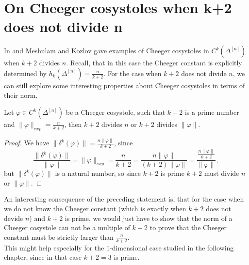%
%
%
%

\section{On Cheeger cosystoles when k+2 does not divide n}\label{section26}

In \cite{4} and \cite{6} Meshulam and Kozlov gave examples of Cheeger cosystoles in \(C^k(\Delta^{[n]})\) when \(k+2\) divides \(n\). Recall, that in this case the Cheeger constant is explicitly determined by \(h_k(\Delta^{[n]})=\frac{n}{k+2}\). For the case when \(k+2\) does not divide \(n\), we can still explore some interesting properties about Cheeger cosystoles in terms of their norm.

\begin{prop}\label{proposition261}
Let \(\varphi\in C^k(\Delta^{[n]})\) be a Cheeger cosystole, such that \(k+2\) is a prime number and \(\|\varphi\|_{exp}=\frac{n}{k+2}\), then \(k+2\) divides \(n\) or \(k+2\) divides \(\|\varphi\|\).
\begin{proof}
We have \(\|\delta^k(\varphi)\|=\frac{n\|\varphi\|}{k+2}\), since
\[
\frac{\|\delta^k(\varphi)\|}{\|\varphi\|}=\|\varphi\|_{exp}=\frac{n}{k+2}=\frac{n\|\varphi\|}{(k+2)\|\varphi\|}=\frac{\frac{n\|\varphi\|}{k+2}}{\|\varphi\|},
\]
but \(\|\delta^k(\varphi)\|\) is a natural number, so since \(k+2\) is prime \(k+2\) must divide \(n\) or \(\|\varphi\|\).
\end{proof}
\end{prop}

An interesting consequence of the preceding statement is, that for the case when we do not know the Cheeger constant (which is exactly when \(k+2\) does not devide \(n\)) and \(k+2\) is prime, we would just have to show that the norm of a Cheeger cosystole can not be a multiple of \(k+2\) to prove that the Cheeger constant must be strictly larger than \(\frac{n}{k+2}\).\\ 
This might help especially for the \(1\)-dimensional case studied in the following chapter, since in that case \(k+2=3\) is prime. 